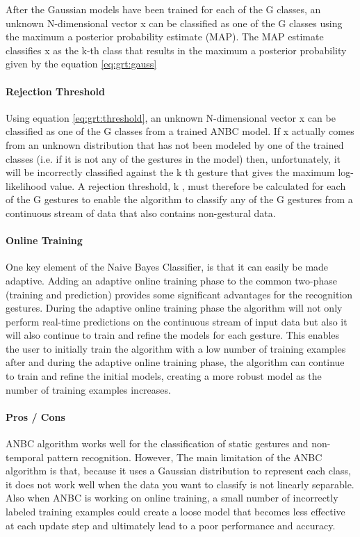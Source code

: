 

After the Gaussian models have been trained for each of the G classes, an unknown N-dimensional vector x can be classified as one of the G classes using the maximum a posterior probability estimate (MAP). The MAP estimate classifies x as the k-th class that results in the maximum a posterior probability given by the equation \ref{eq:grt:gauss}



\paragraph*{Rejection Threshold} Using equation \ref{eq:grt:threshold}, an unknown N-dimensional vector x can be classified as one of the G classes from a trained ANBC model. If x actually comes from an unknown distribution that has not been modeled by one of the trained classes (i.e. if it is not any of the gestures in the model) then, unfortunately, it will be incorrectly classified against the k th gesture that gives the maximum log-likelihood value. A rejection threshold, k , must therefore be calculated for each of the G gestures to enable the algorithm to classify any of the G gestures from a continuous stream of data that also contains non-gestural data.

\paragraph*{Online Training} One key element of the Naive Bayes Classifier, is that it can easily be made adaptive. Adding an adaptive online training phase to the common two-phase (training and prediction) provides some significant advantages for the recognition gestures. During the adaptive online training phase the algorithm will not only perform real-time predictions on the continuous stream of input data but also it will also continue to train and refine the models for each gesture. This enables the user to initially train the algorithm with a low number of training examples after and during the adaptive online training phase, the algorithm can continue to train and refine the initial models, creating a more robust model as the number of training examples increases.

\paragraph*{Pros / Cons} ANBC algorithm works well for the classification of static gestures and non-temporal pattern recognition. However, The main limitation of the ANBC algorithm is that, because it uses a Gaussian distribution to represent each class, it does not work well when the data you want to classify is not linearly separable. Also when ANBC is working on online training, a small number of incorrectly labeled training examples could create a loose model that becomes less effective at each update step and ultimately lead to a poor performance and accuracy.

